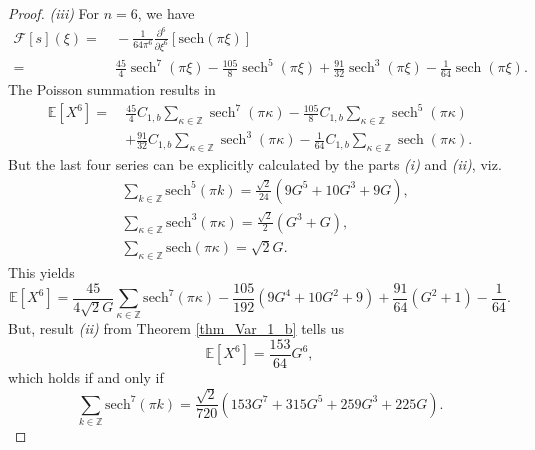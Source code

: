 \documentclass[12pt]{amsart}
\theoremstyle{definition}
\theoremstyle{remark}
\numberwithin{equation}{section}
\newcommand{\1}{\mathbbm{1}}
\begin{document}
\begin{proof}
\textit{(iii)} For $n=6$, we have
\begin{align*}
\mathcal{F}[s](\xi) =&\ -\frac{1}{64 \pi ^6} \frac{\partial^6}{\partial\xi^6} \left[ \mathrm{sech}(\pi \xi)\right]\\
=&\ \frac{45}{4} \operatorname{sech}^7(\pi \xi) - \frac{105}{8}\operatorname{sech}^5 (\pi \xi) + \frac{91}{32} \operatorname{sech}^3(\pi \xi) - \frac{1}{64} \operatorname{sech}(\pi \xi).
\end{align*}
The Poisson summation results in
\begin{align*}
\mathbb{E}\left[X^6\right] =\ &\frac{45}{4} C_{1,b} \sum_{\kappa \in \mathbb{Z}} \operatorname{sech}^7(\pi \kappa) - \frac{105}{8} C_{1,b} \sum_{\kappa \in \mathbb{Z}} \operatorname{sech}^5 (\pi \kappa)\\
&+ \frac{91}{32} C_{1,b} \sum_{\kappa \in \mathbb{Z}} \operatorname{sech}^3(\pi \kappa) - \frac{1}{64} C_{1,b} \sum_{\kappa \in \mathbb{Z}} \operatorname{sech}(\pi \kappa).
\end{align*}
But the last four series can be explicitly calculated by the parts \textit{(i)} and \textit{(ii)}, viz.
\begin{align*}
& \sum_{k \in \mathbb{Z}} \mathrm{sech}^5(\pi k) = \frac{\sqrt{2}}{24}\left(9 G^5 + 10 G^3 + 9 G\right), \\ & \sum_{\kappa \in \mathbb{Z}} \mathrm{sech}^3(\pi \kappa) = \frac{\sqrt{2}}{2} \left(G^3+G\right), \\ & \sum_{\kappa \in \mathbb{Z}} \mathrm{sech}(\pi \kappa) = \sqrt{2}G.
\end{align*}
This yields
$$
\mathbb{E}\left[X^6\right] = \frac{45}{4\sqrt{2}G} \sum_{\kappa \in \mathbb{Z}} \mathrm{sech}^7(\pi \kappa) - \frac{105}{192} \left(9 G^4 + 10 G^2 + 9\right) + \frac{91}{64} \left(G^2 +1 \right) - \frac{1}{64}.
$$
But, result \textit{(ii)} from Theorem \ref{thm_Var_1_b} tells us
$$
\mathbb{E}\left[X^6\right] = \frac{153}{64}G^6,
$$
which holds if and only if
$$
\sum_{k \in \mathbb{Z}} \mathrm{sech}^7(\pi k) = \frac{\sqrt{2}}{720}\left(153 G^7 + 315 G^5 + 259 G^3 + 225 G\right).
$$


\end{proof}
\end{document}
